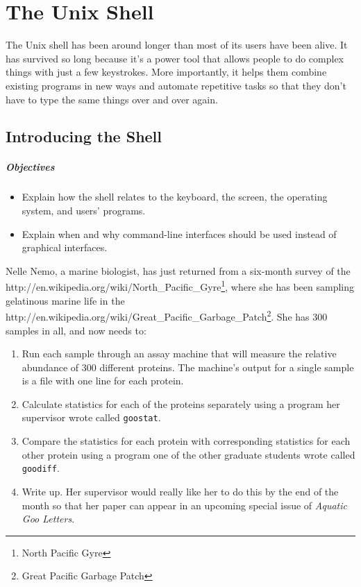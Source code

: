 \documentclass[]{book}
\newcommand{\urlfoot}[2]{{#1}\footnote{#2}}
\begin{document}
\chapter{The Unix Shell}\label{the-unix-shell}

The Unix shell has been around longer than most of its users have been
alive. It has survived so long because it's a power tool that allows
people to do complex things with just a few keystrokes. More
importantly, it helps them combine existing programs in new ways and
automate repetitive tasks so that they don't have to type the same
things over and over again.

\section{Introducing the Shell}

\mbox{}\paragraph{Objectives}

\begin{itemize}
\item
  Explain how the shell relates to the keyboard, the screen, the
  operating system, and users' programs.
\item
  Explain when and why command-line interfaces should be used instead of
  graphical interfaces.
\end{itemize}

Nelle Nemo, a marine biologist, has just returned from a six-month
survey of the
\urlfoot{http://en.wikipedia.org/wiki/North_Pacific_Gyre}{North Pacific
Gyre}, where she has been sampling gelatinous marine life in the
\urlfoot{http://en.wikipedia.org/wiki/Great_Pacific_Garbage_Patch}{Great
Pacific Garbage Patch}. She has 300 samples in all, and now needs to:

\begin{enumerate}
\item
  Run each sample through an assay machine that will measure the
  relative abundance of 300 different proteins. The machine's output for
  a single sample is a file with one line for each protein.
\item
  Calculate statistics for each of the proteins separately using a
  program her supervisor wrote called \texttt{goostat}.
\item
  Compare the statistics for each protein with corresponding statistics
  for each other protein using a program one of the other graduate
  students wrote called \texttt{goodiff}.
\item
  Write up. Her supervisor would really like her to do this by the end
  of the month so that her paper can appear in an upcoming special issue
  of \emph{Aquatic Goo Letters}.
\end{enumerate}
\end{document}
